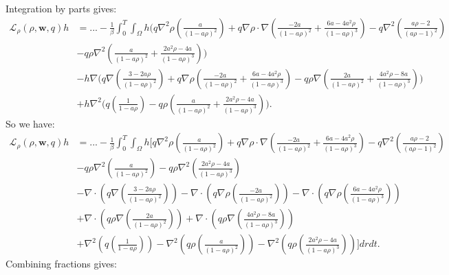 \documentclass[11pt, a4paper]{article}
\theoremstyle{definition}
\newcommand{\w}{\mathbf{w}}
\begin{document}
Integration by parts gives:
\begin{align*}
	\mathcal{L}_\rho(\rho,\w,q)h &=... -\frac{1}{\beta}\int_0^T \int_\Omega h \bigg(q\nabla^2 \rho \left(\frac{a}{(1- a\rho)^2}\right)  + q \nabla \rho \cdot \nabla \left(\frac{-2a }{(1-a\rho)^2} + \frac{6a-4a^2  \rho}{(1-a\rho)^3} \right) - q \nabla^2 \left(\frac{a\rho -2}{(a\rho -1)^2}\right)\\
	&- q\rho  \nabla^2  \left(\frac{a }{(1-a\rho)^2} + \frac{2a^2\rho -4a}{(1-a\rho)^3} \right)\bigg)\\
	&-  h \nabla \bigg( q  \nabla \left( \frac{3-2a\rho}{(1-a\rho)^2} \right) + q \nabla \rho  \left( \frac{-2a }{(1-a\rho)^2} + \frac{6a-4a^2  \rho}{(1-a\rho)^3}  \right)- q\rho \nabla \left(\frac{2a }{(1-a\rho)^2} + \frac{4a^2\rho -8a}{(1-a\rho)^3} \right) \bigg)\\
	&+  h \nabla^2\bigg(q \left(\frac{1}{1- a\rho} \right)  - q\rho  \left(\frac{a }{(1-a\rho)^2} + \frac{2a^2\rho -4a}{(1-a\rho)^3} \right)  \bigg).
\end{align*}
So we have:
\begin{align*}
	\mathcal{L}_\rho(\rho,\w,q)h &=... -\frac{1}{\beta}\int_0^T\int_\Omega h \bigg[  q\nabla^2 \rho \left(\frac{a}{(1- a\rho)^2}\right)  + q \nabla \rho \cdot \nabla \left(\frac{-2a }{(1-a\rho)^2}+ \frac{6a-4a^2  \rho}{(1-a\rho)^3}  \right) - q \nabla^2 \left(\frac{a\rho -2}{(a\rho -1)^2}\right)\\
	&- q\rho  \nabla^2  \left(\frac{a }{(1-a\rho)^2} \right) - q\rho  \nabla^2  \left(\frac{2a^2\rho -4a}{(1-a\rho)^3} \right)\\
	& -\nabla \cdot \left( q  \nabla \left( \frac{3-2a\rho}{(1-a\rho)^2} \right) \right) - \nabla \cdot \left( q \nabla \rho  \left( \frac{-2a }{(1-a\rho)^2} \right)\right)  - \nabla \cdot \left( q \nabla \rho  \left(\frac{6a-4a^2  \rho}{(1-a\rho)^3}  \right)\right)  \\
	& + \nabla \cdot\left( q\rho \nabla \left(\frac{2a }{(1-a\rho)^2} \right) \right) + \nabla \cdot\left( q\rho \nabla \left( \frac{4a^2\rho -8a}{(1-a\rho)^3} \right) \right)\\
	&+   \nabla^2 \left(q \left(\frac{1}{1- a\rho} \right) \right) - \nabla^2 \left(q\rho  \left(\frac{a }{(1-a\rho)^2}\right)\right) - \nabla^2 \left(q\rho \left(\frac{2a^2\rho -4a}{(1-a\rho)^3} \right)\right)\bigg] dr dt .
\end{align*}
Combining fractions gives:
\end{document}
